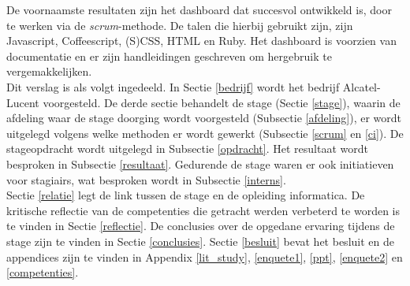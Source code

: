 \documentclass[10pt,a4paper]{article}
\begin{document}
De voornaamste resultaten zijn het dashboard dat succesvol ontwikkeld is, door te werken via de \textit{scrum}-methode. De talen die hierbij gebruikt zijn, zijn Javascript, Coffeescript, (S)CSS, HTML en Ruby. Het dashboard is voorzien van documentatie en er zijn handleidingen geschreven om hergebruik te vergemakkelijken.\\

Dit verslag is als volgt ingedeeld. In Sectie \ref{bedrijf} wordt het bedrijf Alcatel-Lucent voorgesteld. De derde sectie behandelt de stage (Sectie \ref{stage}), waarin de afdeling waar de stage doorging wordt voorgesteld (Subsectie \ref{afdeling}), er wordt uitgelegd volgens welke methoden er wordt gewerkt (Subsectie \ref{scrum} en \ref{ci}). De stageopdracht wordt uitgelegd in Subsectie \ref{opdracht}. Het resultaat wordt besproken in Subsectie \ref{resultaat}. Gedurende de stage waren er ook initiatieven voor stagiairs, wat besproken wordt in Subsectie \ref{interns}.\\
Sectie \ref{relatie} legt de link tussen de stage en de opleiding informatica. De kritische reflectie van de competenties die getracht werden verbeterd te worden is te vinden in Sectie \ref{reflectie}. De conclusies over de opgedane ervaring tijdens de stage zijn te vinden in Sectie \ref{conclusies}. Sectie \ref{besluit} bevat het besluit en de appendices zijn te vinden in Appendix \ref{lit_study}, \ref{enquete1}, \ref{ppt}, \ref{enquete2} en \ref{competenties}. 
\end{document}
